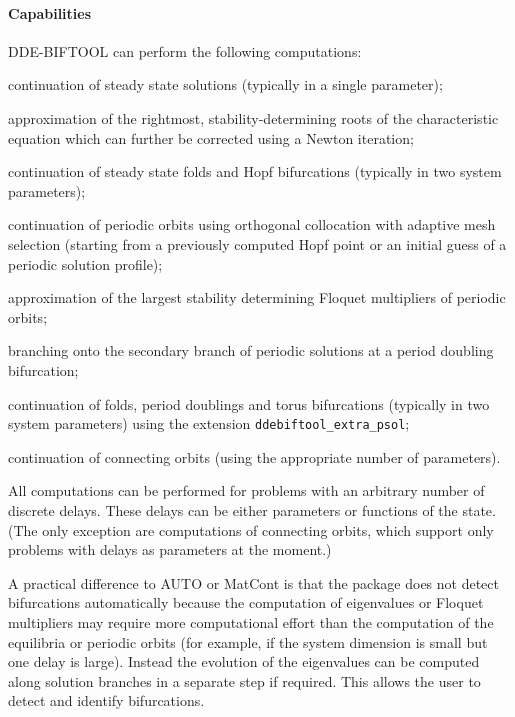 \documentclass[10pt]{scrartcl}
\newcommand{\DDEBIFCODE}{\textsc{DDE-BIFTOOL}}
\begin{document}
\paragraph{Capabilities}
{\DDEBIFCODE} can perform the following computations:
\begin{compactitem}
\item continuation of steady state solutions (typically in a single
  parameter);
\item approximation of the rightmost, stability-determining roots of
  the characteristic equation which can further be corrected using a
  Newton iteration;
\item continuation of steady state folds and Hopf bifurcations
  (typically in two system parameters);
\item continuation of periodic orbits using orthogonal collocation
  with adaptive mesh selection (starting from a previously computed
  Hopf point or an initial guess of a periodic solution profile);
\item approximation of the largest stability determining Floquet
  multipliers of periodic orbits;
\item branching onto the secondary branch of periodic solutions at a
  period doubling bifurcation;
\item continuation of folds, period doublings and torus bifurcations
  (typically in two system parameters) using the extension
  \texttt{ddebiftool\_extra\_psol};
\item continuation of connecting orbits (using the appropriate number
  of parameters).  
\end{compactitem}
All computations can be performed for problems with an arbitrary
number of discrete delays. These delays can be either parameters or
functions of the state.
(The only exception are computations of connecting orbits, which
support only problems with delays as parameters at the moment.)

A practical difference to AUTO or MatCont is that the package does not detect
bifurcations automatically because the computation of eigenvalues or
Floquet multipliers may require more computational effort than the
computation of the equilibria or periodic orbits (for example, if the
system dimension is small but one delay is large). Instead the
evolution of the eigenvalues can be computed along solution branches
in a separate step if required. This allows the user to detect and
identify bifurcations.
\end{document}

